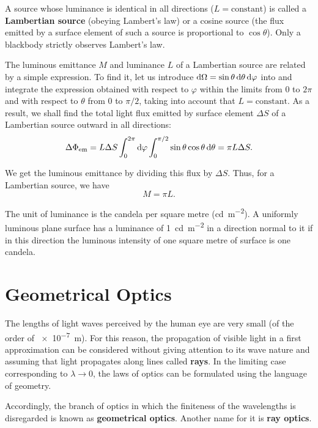 A source whose luminance is identical in all directions ($L = \text{constant}$) is called a \textbf{Lambertian source} (obeying Lambert's law) or a cosine source (the flux emitted by a surface element of such a source is proportional to $\cos\theta$).
Only a blackbody strictly observes Lambert's law.

The luminous emittance $M$ and luminance $L$ of a Lambertian source are related by a simple expression.
To find it, let us introduce $\mathrm{d}\Omega= \sin\theta\,\mathrm{d}\theta\,\mathrm{d}\varphi$ into  and integrate the expression obtained with respect to $\varphi$ within the limits from $0$ to $2\pi$ and with respect to $\theta$ from $0$ to $\pi/2$, taking into account that $L=\text{constant}$.
As a result, we shall find the total light flux emitted by surface element $\Delta{S}$ of a Lambertian source outward in all directions:
\begin{equation*}
    \Delta{\Phi_{\text{em}}} = L \Delta{S} \int_0^{2\pi} \mathrm{d}\varphi \int_0^{\pi/2} \sin\theta \cos\theta\, \mathrm{d}\theta = \pi L \Delta{S}.
\end{equation*}

\noindent
We get the luminous emittance by dividing this flux by $\Delta{S}$.
Thus, for a Lambertian source, we have
\begin{equation}\label{eq:16_50}
    M = \pi L.
\end{equation}

The unit of luminance is the candela per square metre (\si{\candela\per\metre\squared}).
A uniformly luminous plane surface has a luminance of \SI{1}{\candela\per\metre\squared} in a direction normal to it if in this direction the luminous intensity of one square metre of surface is one candela.

\section{Geometrical Optics}\label{sec:16_6}

The lengths of light waves perceived by the human eye are very small (of the order of \SI{e-7}{\metre}).
For this reason, the propagation of visible light in a first approximation can be considered without giving attention to its wave nature and assuming that light propagates along lines called \textbf{rays}.
In the limiting case corresponding to $\lambda\to 0$, the laws of optics can be formulated using the language of geometry.

Accordingly, the branch of optics in which the finiteness of the wavelengths is disregarded is known as \textbf{geometrical optics}.
Another name for it is \textbf{ray optics}.

